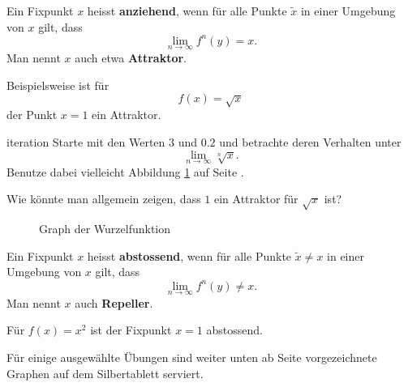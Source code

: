 \documentclass[%
<<<<<<< Updated upstream
11pt,%
twoside,%
titlepage,%
german,%
headsepline%
]{scrartcl}
\begin{document}
\begin{cdef}[Attraktor]
Ein Fixpunkt $x$ heisst \textbf{anziehend}, wenn für alle Punkte $\tilde{x}$ in einer Umgebung von $x$ gilt, dass
$$\lim_{n\to\infty}f^n(y)=x.$$
Man nennt $x$ auch etwa \textbf{Attraktor}.
\end{cdef}

\begin{bsp}
Beispielsweise ist für
$$f(x)=\sqrt{x}$$
der Punkt $x=1$ ein Attraktor.
\end{bsp}


\begin{uebenv}{iteration}
Starte mit den Werten $3$ und $0.2$ und betrachte deren Verhalten unter
$$\lim_{n\to\infty}\sqrt[n]{x}.$$
Benutze dabei vielleicht Abbildung \ref{graph:wurzel} auf Seite \pageref{graph:wurzel}.

Wie könnte man allgemein zeigen, dass $1$ ein Attraktor für $\sqrt{x}$ ist?

\begin{figure}
\centering
{}
\caption{Graph der Wurzelfunktion}\label{graph:wurzel}
\end{figure}
\end{uebenv}




\begin{cdef}[Repeller]
Ein Fixpunkt $x$ heisst \textbf{abstossend}, wenn für alle Punkte $\tilde{x}\neq x$ in einer Umgebung von $x$ gilt, dass
$$\lim_{n\to\infty}f^n(y)\neq x.$$
Man nennt $x$ auch \textbf{Repeller}.
\end{cdef}

\begin{bsp}
Für
$f(x)=x^2$ ist der Fixpunkt $x=1$ abstossend.
\end{bsp}

Für einige ausgewählte Übungen sind weiter unten ab Seite \pageref{graph:gerade} vorgezeichnete Graphen auf dem Silbertablett serviert.
\end{document}
